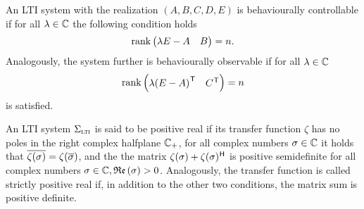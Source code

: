 \begin{definition}\label{def:behaviourally-controllable-observable}
    An \ac{LTI} system with the realization $(A, B, C, D, E)$ is behaviourally controllable if for all $\lambda \in \mathbb{C}$ the following condition holds
    \begin{equation}\label{eq:behaviourally-controllable}
        \mathop{}\!\mathrm{rank}\left(\begin{matrix}
            \lambda E - A & B
        \end{matrix}\right) = n.
    \end{equation}
    Analogously, the system further is behaviourally observable if for all $\lambda \in \mathbb{C}$
    \begin{equation}\label{eq:behaviourally-observable}
        \mathop{}\!\mathrm{rank}\left(\begin{matrix}
            \lambda {(E - A)}^{\mkern1mu \mathsf{T}} & C^{\mkern1mu \mathsf{T}}
        \end{matrix}\right) = n
    \end{equation}
    is satisfied.
\end{definition}

\begin{definition}\label{def:positive-real}
    An \ac{LTI} system $\Sigma_{\textnormal{\scshape lti}}$ is said to be positive real if its transfer function $\zeta$ has no poles in the right complex halfplane $\mathbb{C}_+$, for all complex numbers $\sigma \in \mathbb{C}$ it holds that $\overline{\zeta(\sigma)} = \zeta(\overline{\sigma})$, and the the matrix $\zeta(\sigma) + \zeta(\sigma)^{\mkern1mu \mathsf{H}}$ is positive semidefinite for all complex numbers $\sigma \in \mathbb{C}, \mathop{}\!\mathfrak{Re}\left(\sigma\right) > 0$.
    Analogously, the transfer function is called strictly positive real if, in addition to the other two conditions, the matrix sum is positive definite.
\end{definition}

